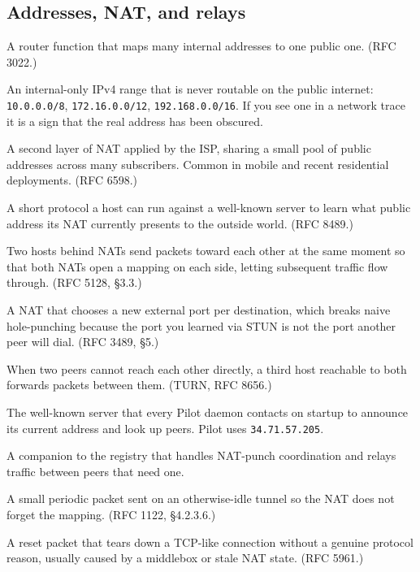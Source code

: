 \documentclass[11pt,a4paper]{article}
\begin{document}
\subsection*{Addresses, NAT, and relays}

\begin{description}[leftmargin=1em,style=nextline]
    \item[\textbf{NAT (Network Address Translation).}]
    A router function that maps many internal addresses to one
    public one. (RFC 3022.)
    \item[\textbf{RFC 1918 address.}]
    An internal-only IPv4 range that is never routable on the
    public internet: \texttt{10.0.0.0/8}, \texttt{172.16.0.0/12},
    \texttt{192.168.0.0/16}. If you see one in a network trace
    it is a sign that the real address has been obscured.
    \item[\textbf{Carrier-grade NAT (CGN / CGNAT).}]
    A second layer of NAT applied by the ISP, sharing a small
    pool of public addresses across many subscribers. Common in
    mobile and recent residential deployments. (RFC 6598.)
    \item[\textbf{STUN.}]
    A short protocol a host can run against a well-known server
    to learn what public address its NAT currently presents to
    the outside world. (RFC 8489.)
    \item[\textbf{NAT hole-punching.}]
    Two hosts behind NATs send packets toward each other at the
    same moment so that both NATs open a mapping on each side,
    letting subsequent traffic flow through. (RFC 5128, \S3.3.)
    \item[\textbf{Symmetric NAT.}]
    A NAT that chooses a new external port per destination,
    which breaks naive hole-punching because the port you
    learned via STUN is not the port another peer will dial.
    (RFC 3489, \S5.)
    \item[\textbf{Relay fallback.}]
    When two peers cannot reach each other directly, a third
    host reachable to both forwards packets between them.
    (TURN, RFC 8656.)
    \item[\textbf{Registry / rendezvous server.}]
    The well-known server that every Pilot daemon contacts on
    startup to announce its current address and look up peers.
    Pilot uses \texttt{34.71.57.205}.
    \item[\textbf{Beacon.}]
    A companion to the registry that handles NAT-punch
    coordination and relays traffic between peers that need one.
    \item[\textbf{Keepalive.}]
    A small periodic packet sent on an otherwise-idle tunnel so
    the NAT does not forget the mapping. (RFC 1122, \S4.2.3.6.)
    \item[\textbf{Spurious RST.}]
    A reset packet that tears down a TCP-like connection without
    a genuine protocol reason, usually caused by a middlebox or
    stale NAT state. (RFC 5961.)
\end{description}
\end{document}
